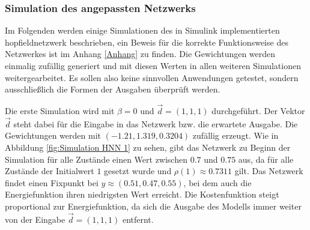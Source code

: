 \subsubsection{Simulation des angepassten Netzwerks}
\label{chap:Simulation des angepassten Netzwerks}

Im Folgenden werden einige Simulationen des in Simulink implementierten \gls{hopfieldnetzwerk} beschrieben, ein Beweis für die korrekte Funktionsweise des Netzwerkes ist im Anhang \ref{Anhang} zu finden. Die Gewichtungen werden einmalig zufällig generiert und mit diesen Werten in allen weiteren Simulationen weitergearbeitet. Es sollen also keine sinnvollen Anwendungen getestet, sondern ausschließlich die Formen der Ausgaben überprüft werden.

Die erste Simulation wird mit \(\beta=0\) und \(\vec{d}=(1,1,1)\) durchgeführt. Der Vektor \(\vec{d}\) steht dabei für die Eingabe in das Netzwerk bzw. die erwartete Ausgabe. Die Gewichtungen werden mit \((-1.21,1.319,0.3204)\) zufällig erzeugt. Wie in Abbildung \ref{fig:Simulation HNN 1} zu sehen, gibt das Netzwerk zu Beginn der Simulation für alle Zustände einen Wert zwischen \(0.7\) und \(0.75\) aus, da für alle Zustände der Initialwert \(1\) gesetzt wurde und \(\rho(1)\approx{0.7311}\) gilt. Das Netzwerk findet einen Fixpunkt bei \(y\approx{(0.51,0.47,0.55)}\), bei dem auch die Energiefunktion ihren niedrigsten Wert erreicht. Die Kostenfunktion steigt proportional zur Energiefunktion, da sich die Ausgabe des Modells immer weiter von der Eingabe \(\vec{d}=(1,1,1)\) entfernt.

